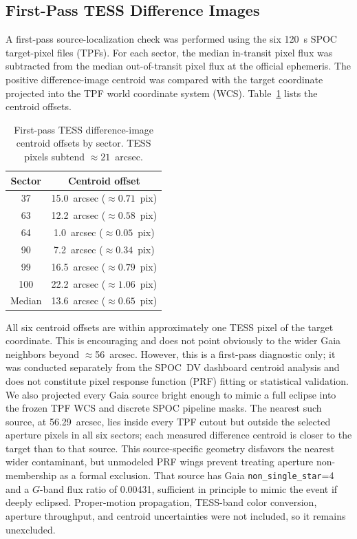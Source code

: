 \documentclass[11pt]{article}
\begin{document}
\subsection{First-Pass TESS Difference Images}

A first-pass source-localization check was performed using the six 120~s
SPOC target-pixel files (TPFs).  For each sector, the median in-transit pixel
flux was subtracted from the median out-of-transit pixel flux at the
official ephemeris.  The positive difference-image centroid was compared
with the target coordinate projected into the TPF world coordinate system
(WCS).
Table~\ref{tab:diffimages} lists the centroid offsets.

\begin{table}[ht]
\centering
\caption{First-pass TESS difference-image centroid offsets by sector.
  TESS pixels subtend $\approx21$~arcsec.}
\label{tab:diffimages}
\begin{tabular}{cc}
\toprule
Sector & Centroid offset \\
\midrule
37  & 15.0~arcsec ($\approx0.71$~pix) \\
63  & 12.2~arcsec ($\approx0.58$~pix) \\
64  &  1.0~arcsec ($\approx0.05$~pix) \\
90  &  7.2~arcsec ($\approx0.34$~pix) \\
99  & 16.5~arcsec ($\approx0.79$~pix) \\
100 & 22.2~arcsec ($\approx1.06$~pix) \\
\midrule
Median & 13.6~arcsec ($\approx0.65$~pix) \\
\bottomrule
\end{tabular}
\end{table}

All six centroid offsets are within approximately one TESS pixel of the
target coordinate.  This is encouraging and does not point obviously to the
wider Gaia neighbors beyond $\approx$56~arcsec.  However, this is a
first-pass diagnostic only; it was conducted separately from the SPOC~DV
dashboard centroid analysis and does not constitute pixel response function
(PRF) fitting or statistical validation.
We also projected every Gaia source bright enough to mimic a full eclipse into
the frozen TPF WCS and discrete SPOC pipeline masks.  The nearest such source,
at 56.29~arcsec, lies inside every TPF cutout but outside the selected aperture
pixels in all six sectors; each measured difference centroid is closer to the
target than to that source.  This source-specific geometry disfavors the
nearest wider contaminant, but unmodeled PRF wings prevent treating aperture
non-membership as a formal exclusion.  That source has Gaia
\texttt{non\_single\_star}=4 and a $G$-band flux ratio of 0.00431, sufficient
in principle to mimic the event if deeply eclipsed.  Proper-motion propagation,
TESS-band color conversion, aperture throughput, and centroid uncertainties
were not included, so it remains unexcluded.
\end{document}
